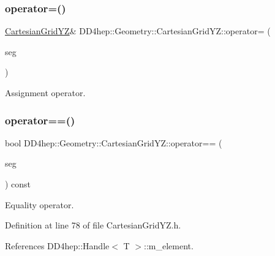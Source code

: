 \subsubsection{\texorpdfstring{operator=()}{operator=()}}
{\footnotesize\ttfamily \hyperlink{class_d_d4hep_1_1_geometry_1_1_cartesian_grid_y_z}{Cartesian\+Grid\+YZ}\& D\+D4hep\+::\+Geometry\+::\+Cartesian\+Grid\+Y\+Z\+::operator= (\begin{DoxyParamCaption}\item[{const \hyperlink{class_d_d4hep_1_1_geometry_1_1_cartesian_grid_y_z}{Cartesian\+Grid\+YZ} \&}]{seg }\end{DoxyParamCaption})\hspace{0.3cm}{\ttfamily [default]}}



Assignment operator. 

\hypertarget{class_d_d4hep_1_1_geometry_1_1_cartesian_grid_y_z_a105528da43274bc50d362c7cdc0ad9e9}{}\label{class_d_d4hep_1_1_geometry_1_1_cartesian_grid_y_z_a105528da43274bc50d362c7cdc0ad9e9} 
\subsubsection{\texorpdfstring{operator==()}{operator==()}}
{\footnotesize\ttfamily bool D\+D4hep\+::\+Geometry\+::\+Cartesian\+Grid\+Y\+Z\+::operator== (\begin{DoxyParamCaption}\item[{const \hyperlink{class_d_d4hep_1_1_geometry_1_1_cartesian_grid_y_z}{Cartesian\+Grid\+YZ} \&}]{seg }\end{DoxyParamCaption}) const\hspace{0.3cm}{\ttfamily [inline]}}



Equality operator. 



Definition at line 78 of file Cartesian\+Grid\+Y\+Z.\+h.



References D\+D4hep\+::\+Handle$<$ T $>$\+::m\+\_\+element.

\hypertarget{class_d_d4hep_1_1_geometry_1_1_cartesian_grid_y_z_a6b71539219f5b4008d16fb832c81e238}{}\label{class_d_d4hep_1_1_geometry_1_1_cartesian_grid_y_z_a6b71539219f5b4008d16fb832c81e238} 
